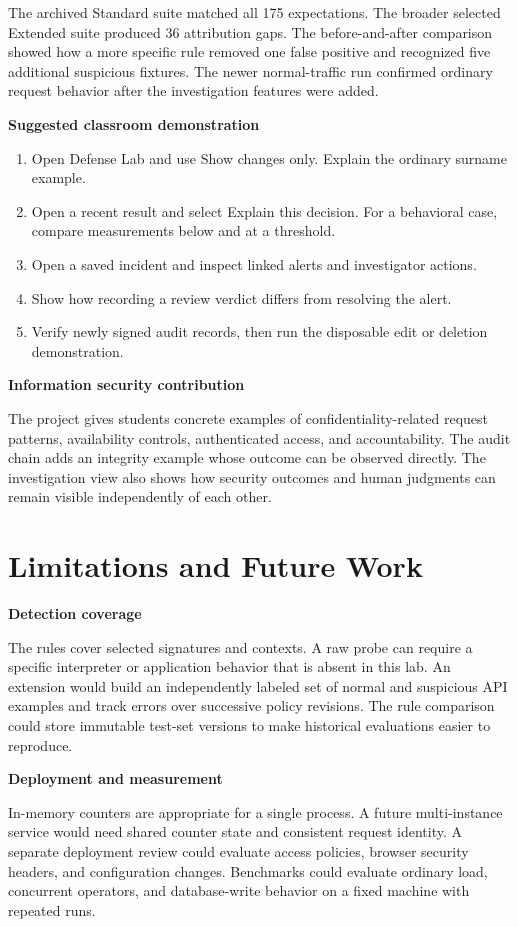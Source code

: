 \documentclass[11pt,letterpaper,oneside]{report}
\newcommand{\topic}[1]{\smallskip\noindent\textbf{#1}\par\nobreak\vspace{-.39em}}
\newcommand{\sheet}[1]{\clearpage\section{#1}}
\begin{document}
The archived Standard suite matched all 175 expectations. The broader selected Extended suite produced 36 attribution gaps. The before-and-after comparison showed how a more specific rule removed one false positive and recognized five additional suspicious fixtures. The newer normal-traffic run confirmed ordinary request behavior after the investigation features were added.

\topic{Suggested classroom demonstration}
\begin{enumerate}
\item Open Defense Lab and use Show changes only. Explain the ordinary surname example.
\item Open a recent result and select Explain this decision. For a behavioral case, compare measurements below and at a threshold.
\item Open a saved incident and inspect linked alerts and investigator actions.
\item Show how recording a review verdict differs from resolving the alert.
\item Verify newly signed audit records, then run the disposable edit or deletion demonstration.
\end{enumerate}

\topic{Information security contribution}
The project gives students concrete examples of confidentiality-related request patterns, availability controls, authenticated access, and accountability. The audit chain adds an integrity example whose outcome can be observed directly. The investigation view also shows how security outcomes and human judgments can remain visible independently of each other.

\sheet{Limitations and Future Work}
\topic{Detection coverage}
The rules cover selected signatures and contexts. A raw probe can require a specific interpreter or application behavior that is absent in this lab. An extension would build an independently labeled set of normal and suspicious API examples and track errors over successive policy revisions. The rule comparison could store immutable test-set versions to make historical evaluations easier to reproduce.

\topic{Deployment and measurement}
In-memory counters are appropriate for a single process. A future multi-instance service would need shared counter state and consistent request identity. A separate deployment review could evaluate access policies, browser security headers, and configuration changes. Benchmarks could evaluate ordinary load, concurrent operators, and database-write behavior on a fixed machine with repeated runs.
\end{document}
